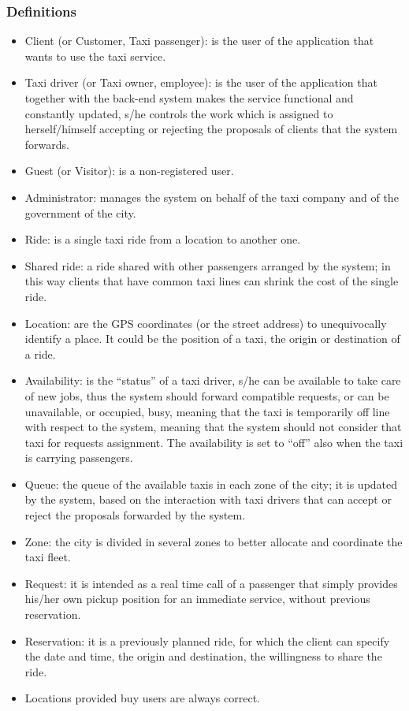 \documentclass[a4paper,11pt]{report} %
\begin{document}
	\subsubsection{Definitions}
		\begin{itemize}
			\item Client (or Customer, Taxi passenger): is the user of the application that wants to use the taxi service.
			\item Taxi driver (or Taxi owner, employee): is the user of the application that together with the back-end system makes the service functional and constantly updated, s/he controls the work which is assigned to herself/himself accepting or rejecting the proposals of clients that the system forwards. 
			\item Guest (or Visitor): is a non-registered user.
			\item Administrator: manages the system on behalf of the taxi company and of the government of the city.
			\item Ride: is a single taxi ride from a location to another one.
			\item Shared ride: a ride shared with other passengers arranged by the system; in this way clients that have common taxi lines can shrink the cost of the single ride.
			\item Location: are the GPS coordinates (or the street address) to unequivocally identify a place. It could be the position of a taxi, the origin or destination of a ride.
			\item Availability: is the ``status'' of a taxi driver, s/he can be available to take care of new jobs, thus the system should forward compatible requests, or can be unavailable, or occupied, busy, meaning that the taxi is temporarily off line with respect to the system, meaning that the system should not consider that taxi for requests assignment. The availability is set to ``off'' also when the taxi is carrying passengers.
			\item Queue: the queue of the available taxis in each zone of the city; it is updated by the system, based on the interaction with taxi drivers that can accept or reject the proposals forwarded by the system. 
			\item Zone: the city is divided in several zones to better allocate and coordinate the taxi fleet.
			\item Request: it is intended as a real time call of a passenger that simply provides his/her own pickup position for an immediate service, without previous reservation.
			\item Reservation: it is a previously planned ride, for which the client can specify the date and time, the origin and destination, the willingness to share the ride.
			\item Locations provided buy users are always correct.
		\end{itemize}
		
\end{document}
